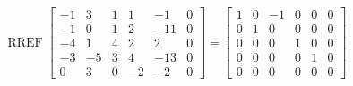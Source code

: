 \begin{exerciseAnswer} 


\[\operatorname{RREF} \left[\begin{array}{ccccc|c}
-1 & 3 & 1 & 1 & -1 & 0 \\
-1 & 0 & 1 & 2 & -11 & 0 \\
-4 & 1 & 4 & 2 & 2 & 0 \\
-3 & -5 & 3 & 4 & -13 & 0 \\
0 & 3 & 0 & -2 & -2 & 0
\end{array}\right] = \left[\begin{array}{ccccc|c}
1 & 0 & -1 & 0 & 0 & 0 \\
0 & 1 & 0 & 0 & 0 & 0 \\
0 & 0 & 0 & 1 & 0 & 0 \\
0 & 0 & 0 & 0 & 1 & 0 \\
0 & 0 & 0 & 0 & 0 & 0
\end{array}\right] \]



\end{exerciseAnswer}
